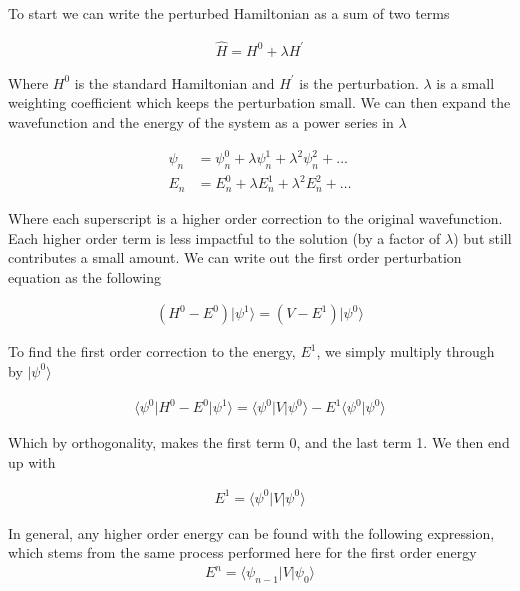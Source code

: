         To start we can write the perturbed Hamiltonian as a sum of two terms

        \begin{align}
            \hat{H} = H^0 + \lambda H^\prime
        \end{align}

        Where $H^0$ is the standard Hamiltonian and $H^\prime$ is the perturbation. $\lambda$ is a small weighting coefficient which keeps the perturbation small. We can then expand the wavefunction and the energy of the system as a power series in $\lambda$

        \begin{align}
            \psi_n &= \psi_n^0 + \lambda \psi_n^1 + \lambda^2 \psi_n^2 + \dots\\
            E_n &= E_n^0 + \lambda E_n^1 + \lambda^2 E_n^2 + \dots
        \end{align}

        Where each superscript is a higher order correction to the original wavefunction. Each higher order term is less impactful to the solution (by a factor of $\lambda$) but still contributes a small amount. We can write out the first order perturbation equation as the following

        \begin{align}
            \left( H^0 - E^0 \right) \vert \psi^1 \rangle = \left(V - E^1 \right) \vert \psi^0 \rangle
        \end{align}

        To find the first order correction to the energy, $E^1$, we simply multiply through by $\vert \psi^0 \rangle$

        \begin{align}
            \langle \psi^0 \vert H^0 - E^0 \vert \psi^1 \rangle = \langle \psi^0 \vert V \vert \psi^0 \rangle -E^1 \langle \psi^0  \vert \psi^0 \rangle
        \end{align}

        Which by orthogonality, makes the first term 0, and the last term 1. We then end up with

        \begin{align}
            E^1 = \langle \psi^0 \vert V \vert \psi^0 \rangle
        \end{align}

        In general, any higher order energy can be found with the following expression, which stems from the same process performed here for the first order energy
        \begin{align}
            E^n = \langle \psi_{n-1} \vert V \vert \psi_0 \rangle
        \end{align}

